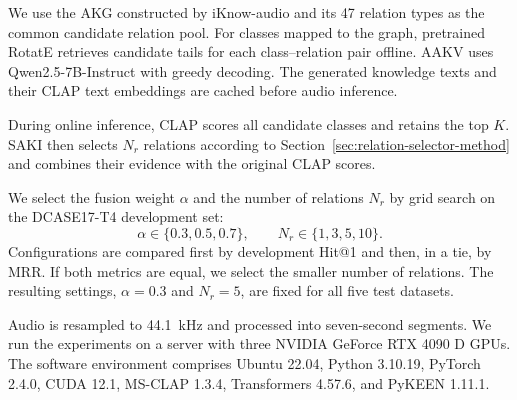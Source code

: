 We use the AKG constructed by iKnow-audio and its 47 relation types as the common candidate relation pool. For classes mapped to the graph, pretrained RotatE retrieves candidate tails for each class--relation pair offline. AAKV uses Qwen2.5-7B-Instruct with greedy decoding. The generated knowledge texts and their CLAP text embeddings are cached before audio inference.

During online inference, CLAP scores all candidate classes and retains the top $K$. SAKI then selects $N_r$ relations according to Section~\ref{sec:relation-selector-method} and combines their evidence with the original CLAP scores.

We select the fusion weight $\alpha$ and the number of relations $N_r$ by grid search on the DCASE17-T4 development set:
\begin{equation}
\alpha\in\{0.3,0.5,0.7\},\qquad
N_r\in\{1,3,5,10\}.
\end{equation}
Configurations are compared first by development Hit@1 and then, in a tie, by MRR. If both metrics are equal, we select the smaller number of relations. The resulting settings, $\alpha=0.3$ and $N_r=5$, are fixed for all five test datasets.

Audio is resampled to 44.1~kHz and processed into seven-second segments.  We run the experiments on a server with three NVIDIA GeForce RTX 4090 D GPUs. The software environment comprises Ubuntu 22.04, Python 3.10.19, PyTorch 2.4.0, CUDA 12.1, MS-CLAP 1.3.4, Transformers 4.57.6, and PyKEEN 1.11.1.




